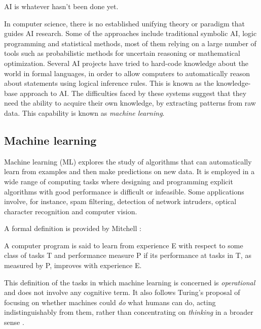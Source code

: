 \begin{Theorem}
    AI is whatever hasn't been done yet.
\end{Theorem}

In computer science, there is no established unifying theory or paradigm that guides AI research. Some of the approaches include traditional symbolic AI, logic programming and statistical methods, most of them relying on a large number of tools such as probabilistic methods for uncertain reasoning or mathematical optimization.
Several AI projects have tried to hard-code knowledge about the world in formal languages, in order to allow computers to automatically reason about statements using logical inference rules. This is known as the knowledge-base approach to AI. The difficulties faced by these systems suggest that they need the ability to acquire their own knowledge, by extracting patterns from raw data. This capability is known as \textit{machine learning}.


\subsection{Machine learning}

Machine learning (ML) explores the study of algorithms that can automatically learn from examples and then make predictions on new data. It is employed in a wide range of computing tasks where designing and programming explicit algorithms with good performance is difficult or infeasible. Some applications involve, for instance, spam filtering, detection of network intruders, optical character recognition and computer vision.

A formal definition is provided by Mitchell \cite{mitchell}:

\begin{Definition}
    A computer program is said to learn from experience E with respect to some class of tasks T and performance measure P if its performance at tasks in T, as measured by P, improves with experience E.
\end{Definition}

This definition of the tasks in which machine learning is concerned is \textit{operational} and does not involve any cognitive term. It also follows Turing's proposal of focusing on whether machines could \textit{do} what humans can do, acting indistinguishably from them, rather than concentrating on \textit{thinking} in a broader sense \cite{alan}.

